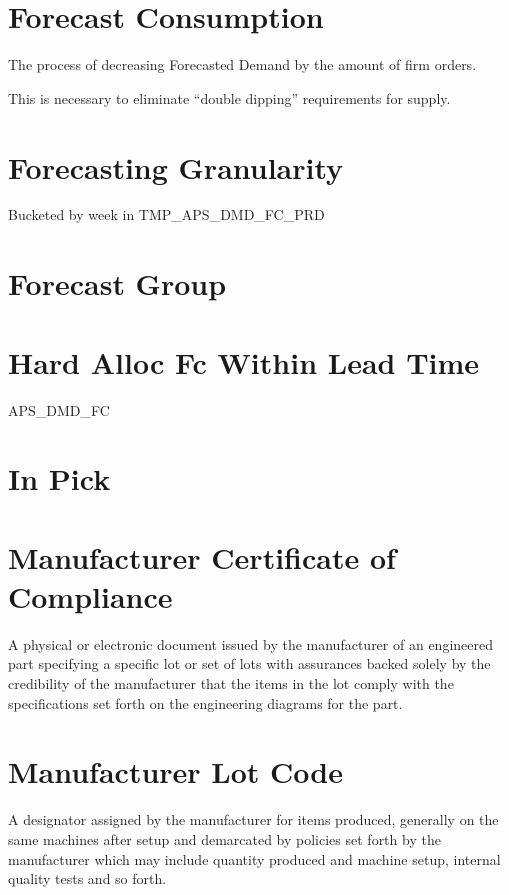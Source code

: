 \documentclass[letterpaper,10pt,english]{sphinxmanual}
\begin{document}
\section{Forecast Consumption}
\label{APS/Glossary:forecast-consumption}
The process of decreasing Forecasted Demand by the amount of firm
orders.

This is necessary to eliminate “double dipping” requirements for supply.


\section{Forecasting Granularity}
\label{APS/Glossary:forecasting-granularity}
Bucketed by week in TMP\_APS\_DMD\_FC\_PRD


\section{Forecast Group}
\label{APS/Glossary:forecast-group}

\section{Hard Alloc Fc Within Lead Time}
\label{APS/Glossary:hard-alloc-fc-within-lead-time}
APS\_DMD\_FC


\section{In Pick}
\label{APS/Glossary:in-pick}

\section{Manufacturer Certificate of Compliance}
\label{APS/Glossary:manufacturer-certificate-of-compliance}
A physical or electronic document issued by the manufacturer of an
engineered part specifying a specific lot or set of lots with assurances
backed solely by the credibility of the manufacturer that the items in
the lot comply with the specifications set forth on the engineering
diagrams for the part.


\section{Manufacturer Lot Code}
\label{APS/Glossary:manufacturer-lot-code}
A designator assigned by the manufacturer for items produced, generally
on the same machines after setup and demarcated by policies set forth by
the manufacturer which may include quantity produced and machine setup,
internal quality tests and so forth.
\end{document}
